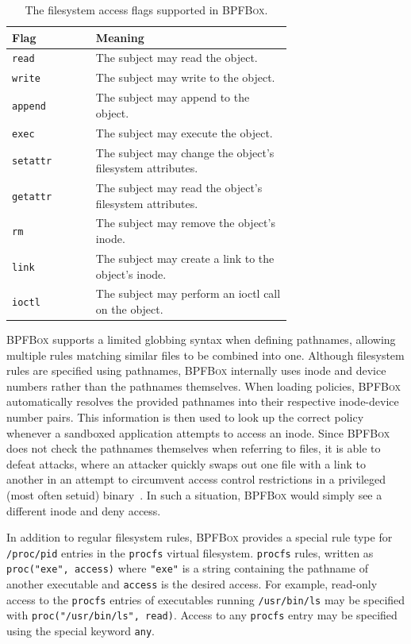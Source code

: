 \documentclass[
  fontsize=12pt,
  titlepage=firstiscover,
  paper=letter,
oneside,
  cleardoublepage=plain,
  parskip=half-,
  DIV=10,
  parindent,
  appendixprefix,
  chapterprefix,
  listof=totoc,
]{scrbook}
\newcommand{\bpfbox}{\textsc{BPFBox}}
\begin{document}
\begin{table}[htpb]
    \centering
    \caption{The filesystem access flags supported in \bpfbox{}.}
    \label{tab:fs-access}
    \begin{tabular}{lp{0.7\linewidth}}
    \toprule
    Flag & Meaning \\
    \midrule
    \texttt{read}    & The subject may read the object. \\
    \texttt{write}   & The subject may write to the object. \\
    \texttt{append}  & The subject may append to the object. \\
    \texttt{exec}    & The subject may execute the object. \\
    \texttt{setattr} & The subject may change the object's filesystem attributes. \\
    \texttt{getattr} & The subject may read the object's filesystem attributes. \\
    \texttt{rm}      & The subject may remove the object's inode. \\
    \texttt{link}    & The subject may create a link to the object's inode. \\
    \texttt{ioctl}   & The subject may perform an ioctl call on the object. \\
    \bottomrule
    \end{tabular}
\end{table}

\bpfbox{} supports a limited globbing syntax when defining pathnames, allowing multiple
rules matching similar files to be combined into one.  Although filesystem rules are
specified using pathnames, \bpfbox{} internally uses inode and device numbers rather than
the pathnames themselves. When loading policies, \bpfbox{} automatically resolves the
provided pathnames into their respective inode-device number pairs. This information is
then used to look up the correct policy whenever a sandboxed application attempts to
access an inode.  Since \bpfbox{} does not check the pathnames themselves when referring
to files, it is able to defeat  attacks, where an
attacker quickly swaps out one file with a link to another in an attempt to circumvent
access control restrictions in a privileged (most often setuid)
binary~\cite{bishop1996_checking}.  In such a situation, \bpfbox{} would simply see
a different inode and deny access.

In addition to regular filesystem rules, \bpfbox{} provides a special rule type for
\texttt{/proc/pid} entries in the \texttt{procfs} virtual filesystem. \texttt{procfs}
rules, written as \lstinline[language=bpfbox]{proc("exe", access)} where
\lstinline[language=bpfbox]{"exe"} is a string containing the pathname of another
executable and \lstinline[language=bpfbox]{access} is the desired access. For example,
read-only access to the \texttt{procfs} entries of executables running
\texttt{/usr/bin/ls} may be specified with \lstinline[language=bpfbox]{proc("/usr/bin/ls", read)}.
Access to any \texttt{procfs} entry may be specified using the special keyword
\lstinline[language=bpfbox]{any}.
\end{document}
